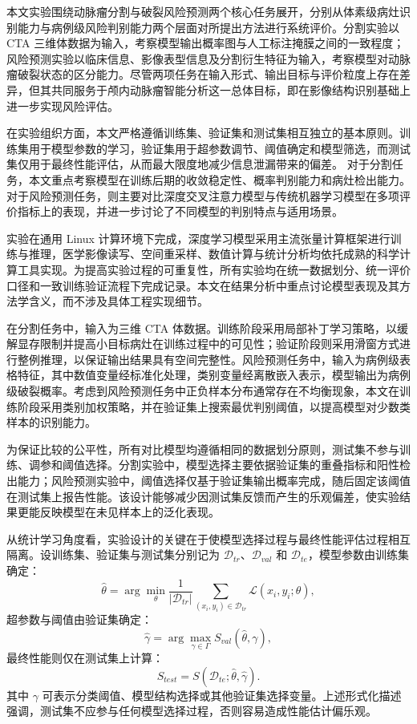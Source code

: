 
本文实验围绕动脉瘤分割与破裂风险预测两个核心任务展开，分别从体素级病灶识别能力与病例级风险判别能力两个层面对所提出方法进行系统评价。分割实验以 CTA 三维体数据为输入，考察模型输出概率图与人工标注掩膜之间的一致程度；风险预测实验以临床信息、影像表型信息及分割衍生特征为输入，考察模型对动脉瘤破裂状态的区分能力。尽管两项任务在输入形式、输出目标与评价粒度上存在差异，但其共同服务于颅内动脉瘤智能分析这一总体目标，即在影像结构识别基础上进一步实现风险评估。

在实验组织方面，本文严格遵循训练集、验证集和测试集相互独立的基本原则。训练集用于模型参数的学习，验证集用于超参数调节、阈值确定和模型筛选，而测试集仅用于最终性能评估，从而最大限度地减少信息泄漏带来的偏差。
对于分割任务，本文重点考察模型在训练后期的收敛稳定性、概率判别能力和病灶检出能力。对于风险预测任务，则主要对比深度交叉注意力模型与传统机器学习模型在多项评价指标上的表现，并进一步讨论了不同模型的判别特点与适用场景。

实验在通用 Linux 计算环境下完成，深度学习模型采用主流张量计算框架进行训练与推理，医学影像读写、空间重采样、数值计算与统计分析均依托成熟的科学计算工具实现。为提高实验过程的可重复性，所有实验均在统一数据划分、统一评价口径和一致训练验证流程下完成记录。本文在结果分析中重点讨论模型表现及其方法学含义，而不涉及具体工程实现细节。

在分割任务中，输入为三维 CTA 体数据。训练阶段采用局部补丁学习策略，以缓解显存限制并提高小目标病灶在训练过程中的可见性；验证阶段则采用滑窗方式进行整例推理，以保证输出结果具有空间完整性。风险预测任务中，输入为病例级表格特征，其中数值变量经标准化处理，类别变量经离散嵌入表示，模型输出为病例级破裂概率。考虑到风险预测任务中正负样本分布通常存在不均衡现象，本文在训练阶段采用类别加权策略，并在验证集上搜索最优判别阈值，以提高模型对少数类样本的识别能力。

为保证比较的公平性，所有对比模型均遵循相同的数据划分原则，测试集不参与训练、调参和阈值选择。分割实验中，模型选择主要依据验证集的重叠指标和阳性检出能力；风险预测实验中，阈值选择仅基于验证集输出概率完成，随后固定该阈值在测试集上报告性能。该设计能够减少因测试集反馈而产生的乐观偏差，使实验结果更能反映模型在未见样本上的泛化表现。

从统计学习角度看，实验设计的关键在于使模型选择过程与最终性能评估过程相互隔离。设训练集、验证集与测试集分别记为 $\mathcal{D}_{tr}$、$\mathcal{D}_{val}$ 和 $\mathcal{D}_{te}$，模型参数由训练集确定：
\begin{equation}
\hat{\theta}=\arg\min_{\theta}\frac{1}{|\mathcal{D}_{tr}|}\sum_{(x_i,y_i)\in\mathcal{D}_{tr}}\mathcal{L}(x_i,y_i;\theta),
\end{equation}
超参数与阈值由验证集确定：
\begin{equation}
\hat{\gamma}=\arg\max_{\gamma\in\Gamma}S_{val}(\hat{\theta},\gamma),
\end{equation}
最终性能则仅在测试集上计算：
\begin{equation}
S_{test}=S(\mathcal{D}_{te};\hat{\theta},\hat{\gamma}).
\end{equation}
其中 $\gamma$ 可表示分类阈值、模型结构选择或其他验证集选择变量。上述形式化描述强调，测试集不应参与任何模型选择过程，否则容易造成性能估计偏乐观。

